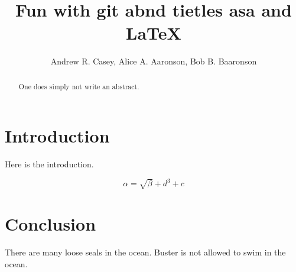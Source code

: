 \documentclass{article}
\begin{document}
\title{Fun with git abnd tietles asa and \LaTeX{}}
\author{Andrew R. Casey, Alice A. Aaronson, Bob B. Baaronson}

\maketitle

\begin{abstract}
One does simply not write an abstract.
\end{abstract}

\section{Introduction}
Here is the introduction.

\begin{equation}
    \label{simple_equation}
    \alpha = \sqrt{ \beta } + d^3 + c
\end{equation}


\section{Conclusion}
There are many loose seals in the ocean. Buster is not allowed to swim in the ocean.
\end{document}
